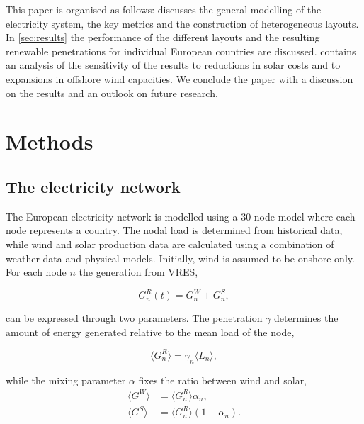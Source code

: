\documentclass[a4paper, 5p, sort&compress]{elsarticle}%
\newcommand{\mean}[1]{\langle #1 \rangle}
\newcommand{\paren}[1]{\left(#1\right)}
\begin{document}
This paper is organised as follows:  discusses the
general modelling of the electricity system, the key metrics and the
construction of heterogeneous layouts.  In \cref{sec:results} the performance of the different
layouts and the resulting renewable penetrations for individual
European countries are discussed. 
contains an analysis of the sensitivity of the results to reductions
in solar costs and to expansions in offshore wind capacities. We
conclude the paper with a discussion on the results and an outlook on
future research.

\section{Methods}
\label{sec:two}
\subsection{The electricity network}

The European electricity network is modelled using a 30-node model
where each node represents a country. The nodal load is determined
from historical data, while wind and solar production data are
calculated using a combination of weather data and physical
models\cite{REA}. Initially, wind is assumed to be onshore only. For
each node $n$ the generation from VRES,

\begin{equation}
  G^{R}_{n}(t) = G_{n}^{W} + G_{n}^{S},
\end{equation} 

can be expressed through two parameters. The penetration $\gamma$
determines the amount of energy generated relative to the mean load of
the node,

\begin{equation}
  \mean{G^{R}_{n}} = \gamma_{n} \mean{L_{n}} ,
\end{equation} 

while the mixing parameter $\alpha$ fixes the ratio between wind and solar,
\begin{align}
  \mean{G^{W}} &= \mean{G_{n}^{R}} \alpha_{n}  , \\
  \mean{G^{S}} &= \mean{G_{n}^{R}} \paren{1- \alpha_{n}}  .
\end{align} 
\end{document}
